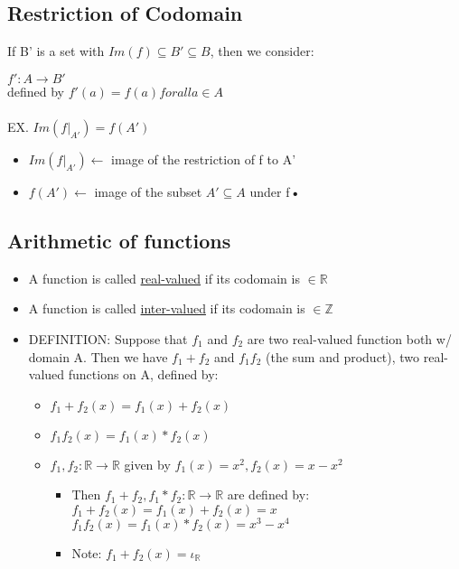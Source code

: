 \documentclass{article}
\begin{document}
\subsection{Restriction of Codomain}
If B' is a set with $Im(f) \subseteq B' \subseteq B$, then we consider:

\indent $f':A \rightarrow B'$\\
\indent defined by  $f'(a) = f(a) for all a \in A$\\ \\
\indent EX. $Im(f|_{A'}) = f(A')$\\
\begin{itemize}
\item $Im(f|_{A'}) \leftarrow$ image of the restriction of f to A'
\item $f(A') \leftarrow$ image of the subset $A' \subseteq A$ under f\textbf{•} 
\end{itemize}

\subsection{Arithmetic of functions}
\begin{itemize}
\item A function is called \underline{real-valued} if its codomain is $\in \mathbb{R}$
\item A function is called \underline{inter-valued} if its codomain is $\in \mathbb{Z}$
\item DEFINITION: Suppose that $f_{1}$ and $f_{2}$ are two real-valued function both w/ domain A. Then we have $f_{1} + f_{2}$ and $f_{1}f_{2}$ (the sum and product), two real-valued functions on A, defined by:
\begin{itemize}
\item $f_{1} + f_{2}(x) = f_{1}(x) + f_{2}(x)$
\item $f_{1}f_{2}(x) = f_{1}(x) * f_{2}(x)$
\item $f_{1},f_{2}:\mathbb{R} \rightarrow \mathbb{R}$ given by $f_{1}(x)=x^2, f_{2}(x)=x-x^2$
\begin{itemize}
\item Then $f_{1}+f_{2}, f_{1}*f_{2}:\mathbb{R} \rightarrow \mathbb{R}$ are defined by:\\
			$f_{1} + f_{2}(x) = f_{1}(x) + f_{2}(x)=x $\\
			$f_{1}f_{2}(x) = f_{1}(x) * f_{2}(x)=x^3-x^4$
\item Note: $f_{1} + f_{2}(x) = \iota_{\mathbb{R}}$
\end{itemize}
\end{itemize}
\end{itemize}
\end{document}
